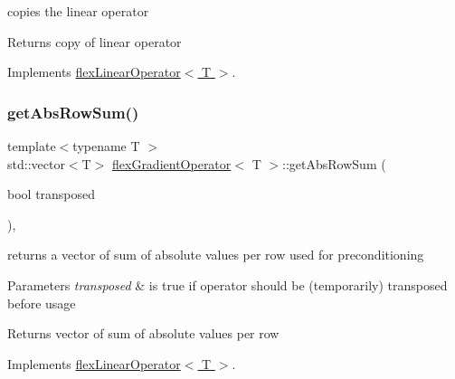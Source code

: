 copies the linear operator 

\begin{DoxyReturn}{Returns}
copy of linear operator 
\end{DoxyReturn}


Implements \hyperlink{classflex_linear_operator_a7cc1425677cc30fcbd092ffd28d508c9}{flex\+Linear\+Operator$<$ T $>$}.

\mbox{\label{classflex_gradient_operator_a04950a1e57f7587b95824bfd82b35738}} 
\subsubsection{\texorpdfstring{get\+Abs\+Row\+Sum()}{getAbsRowSum()}}
{\footnotesize\ttfamily template$<$typename T $>$ \\
std\+::vector$<$T$>$ \hyperlink{classflex_gradient_operator}{flex\+Gradient\+Operator}$<$ T $>$\+::get\+Abs\+Row\+Sum (\begin{DoxyParamCaption}\item[{bool}]{transposed }\end{DoxyParamCaption})\hspace{0.3cm}{\ttfamily [inline]}, {\ttfamily [virtual]}}



returns a vector of sum of absolute values per row used for preconditioning 


\begin{DoxyParams}{Parameters}
{\em transposed} & is true if operator should be (temporarily) transposed before usage \\
\hline
\end{DoxyParams}
\begin{DoxyReturn}{Returns}
vector of sum of absolute values per row 
\end{DoxyReturn}


Implements \hyperlink{classflex_linear_operator_ad6caa7b09e6e3c401cadef61b8e2307e}{flex\+Linear\+Operator$<$ T $>$}.

\mbox{\label{classflex_gradient_operator_ac5cf151db87946ac0f1864344db260d5}} 
